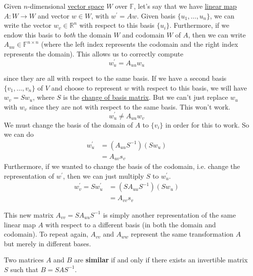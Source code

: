 	Given $n$-dimensional \hyperref[def:vector-space]{vector space} $W$ over $\mathbb{F}$, let's say that we have \hyperref[def:linear_map]{linear map} $A: W \to W$ and vector $w \in W$, with $w^\prime = Aw$. Given basis $\{u_1, \ldots, u_n\}$, we can write the vector $w_v \in \mathbb{R}^n$ with respect to this basis $\{u_i\}$. Furthermore, if we endow this basis to \textit{both} the domain $W$ and codomain $W$ of $A$, then we can write $A_{uu} \in \mathbb{F}^{n \times n}$ (where the left index represents the codomain and the right index represents the domain). This allows us to correctly compute 
	\begin{equation}
		w^\prime_u = A_{uu} w_u
	\end{equation}

	since they are all with respect to the same basis. If we have a second basis $\{v_1, \ldots, v_n\}$ of $V$ and choose to represent $w$ with respect to this basis, we will have $w_v = S w_u$, where $S$ is the \hyperref[def:change-of-basis-matrix]{change of basis matrix}. But we can't just replace $w_u$ with $w_v$ since they are not with respect to the same basis. This won't work. 
	\begin{equation}
		w^\prime_u \neq A_{uu} w_v
	\end{equation} 
	We must change the basis of the domain of $A$ to $\{v_i\}$ in order for this to work. So we can do 
	\begin{align}
		w_u^\prime & = (A_{uu} S^{-1}) (S w_u) \\ 
							 & = A_{uv} s_v
	\end{align} 
	Furthermore, if we wanted to change the basis of the codomain, i.e. change the representation of $w^\prime$, then we can just multiply $S$ to $w_u^\prime$. 
	\begin{align}
		w_v^\prime = S w_u^\prime & = (S A_{uu} S^{-1}) (S w_u) \\ 
															& = A_{vv} s_v
	\end{align}

	This new matrix $A_{vv} = S A_{uu} S^{-1}$ is simply another representation of the same linear map $A$ with respect to a different basis (in both the domain and codomain). To repeat again, $A_{vv}$ and $A_{ww}$ represent the same transformation $A$ but merely in different bases. 

  \begin{definition}
    \label{def:similar-matrices}
    Two matrices $A$ and $B$ are \textbf{similar} if and only if there exists an invertible matrix $S$ such that $B = S A S^{-1}$. 
  \end{definition}

